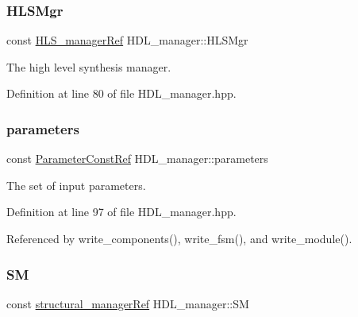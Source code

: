 \subsubsection{\texorpdfstring{H\+L\+S\+Mgr}{HLSMgr}}
{\footnotesize\ttfamily const \hyperlink{hls__manager_8hpp_acd3842b8589fe52c08fc0b2fcc813bfe}{H\+L\+S\+\_\+manager\+Ref} H\+D\+L\+\_\+manager\+::\+H\+L\+S\+Mgr\hspace{0.3cm}{\ttfamily [private]}}



The high level synthesis manager. 



Definition at line 80 of file H\+D\+L\+\_\+manager.\+hpp.

\mbox{\label{classHDL__manager_a45df650b0a63aaf4771fd72ffa22bfa5}} 
\subsubsection{\texorpdfstring{parameters}{parameters}}
{\footnotesize\ttfamily const \hyperlink{Parameter_8hpp_a37841774a6fcb479b597fdf8955eb4ea}{Parameter\+Const\+Ref} H\+D\+L\+\_\+manager\+::parameters\hspace{0.3cm}{\ttfamily [private]}}



The set of input parameters. 



Definition at line 97 of file H\+D\+L\+\_\+manager.\+hpp.



Referenced by write\+\_\+components(), write\+\_\+fsm(), and write\+\_\+module().

\mbox{\label{classHDL__manager_ad3199056804702202557a71f2d78d14e}} 
\subsubsection{\texorpdfstring{SM}{SM}}
{\footnotesize\ttfamily const \hyperlink{structural__manager_8hpp_ab3136f0e785d8535f8d252a7b53db5b5}{structural\+\_\+manager\+Ref} H\+D\+L\+\_\+manager\+::\+SM\hspace{0.3cm}{\ttfamily [private]}}



